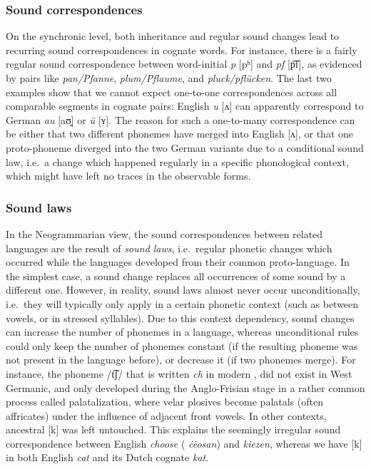 \subsubsection{Sound correspondences}
On the synchronic level, both inheritance and regular sound changes lead to recurring sound correspondences in cognate words. For instance, there is a fairly regular sound correspondence between word-initial  \textit{p} {[pʰ]} and  \textit{pf} [p͡f], as evidenced by pairs like \textit{pan/Pfanne}, \textit{plum/Pflaume}, and \textit{pluck/pflücken}. The last two examples show that we cannot expect one-to-one correspondences across all comparable segments in cognate pairs: English \textit{u} [ʌ] can apparently correspond to German \textit{au} [aʊ̯] or \textit{ü} [ʏ]. The reason for such a one-to-many correspondence can be either that two different phonemes have merged into English [ʌ], or that one proto-phoneme diverged into the two German variants due to a conditional sound law, i.e.\ a change which happened regularly in a specific phonological context, which might have left no traces in the observable forms.

\subsubsection{Sound laws}
In the Neogrammarian view, the sound correspondences between related languages are the result of \textit{sound laws}, i.e.\ regular phonetic changes which occurred while the languages developed from their common proto-language. In the simplest case, a sound change replaces all occurrences of some sound by a different one. However, in reality, sound laws almost never occur unconditionally, i.e.\ they will typically only apply in a certain phonetic context (such as between vowels, or in stressed syllables). Due to this context dependency, sound changes can increase the number of phonemes in a language, whereas unconditional rules could only keep the number of phonemes constant (if the resulting phoneme was not present in the language before), or decrease it (if two phonemes merge). For instance, the phoneme /t͡ʃ/ that is written \textit{ch} in modern , did not exist in West Germanic, and only developed during the Anglo-Frisian stage in a rather common process called palatalization, where velar plosives become palatals (often affricates) under the influence of adjacent front vowels. In other contexts, ancestral [k] was left untouched. This explains the seemingly irregular sound correspondence between English \textit{choose} ( \textit{ċēosan}) and  \textit{kiezen}, whereas we have [k] in both English \textit{cat} and its Dutch cognate \textit{kat}.

